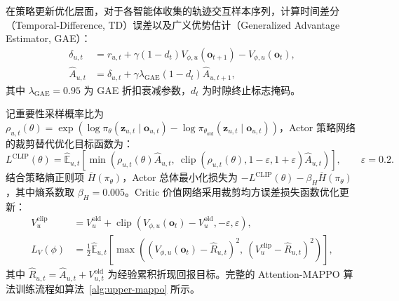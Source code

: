 在策略更新优化层面，对于各智能体收集的轨迹交互样本序列，计算时间差分（Temporal-Difference, TD）误差以及广义优势估计（Generalized Advantage Estimator, GAE）：
\begin{equation}
    \begin{aligned}
    \delta_{u,t} &= r_{u,t} + \gamma (1 - d_t) V_{\phi,u}(\mathbf o_{t+1}) - V_{\phi,u}(\mathbf o_t),\\
    \widehat A_{u,t} &= \delta_{u,t} + \gamma \lambda_{\mathrm{GAE}} (1 - d_t) \widehat A_{u,t+1},
    \end{aligned}
    \label{eq:gae}
\end{equation}
其中 $\lambda_{\mathrm{GAE}} = 0.95$ 为 GAE 折扣衰减参数，$d_t$ 为时隙终止标志掩码。

记重要性采样概率比为 $\rho_{u,t}(\theta) = \exp\left(\log\pi_\theta(\mathbf z_{u,t}\mid\mathbf o_{u,t}) - \log\pi_{\theta_{\mathrm{old}}}(\mathbf z_{u,t}\mid\mathbf o_{u,t})\right)$，Actor 策略网络的裁剪替代优化目标函数为：
\begin{equation}
    L^{\mathrm{CLIP}}(\theta) = \widehat{\mathbb E}_{u,t}\left[\min\left(
    \rho_{u,t}(\theta)\widehat A_{u,t}, \ 
    \operatorname{clip}(\rho_{u,t}(\theta), 1 - \varepsilon, 1 + \varepsilon)\widehat A_{u,t}
    \right)\right], \qquad \varepsilon=0.2.
    \label{eq:ppo-clip}
\end{equation}
结合策略熵正则项 $\overline H(\pi_\theta)$，Actor 总体最小化损失为 $-L^{\mathrm{CLIP}}(\theta) - \beta_H \overline H(\pi_\theta)$，其中熵系数取 $\beta_H = 0.005$。Critic 价值网络采用裁剪均方误差损失函数优化更新：
\begin{equation}
    \begin{aligned}
    V_u^{\mathrm{clip}} &= V_u^{\mathrm{old}} + \operatorname{clip}\left(V_{\phi,u}(\mathbf o_t) - V_u^{\mathrm{old}}, -\varepsilon, \varepsilon\right),\\
    L_V(\phi) &= \frac{1}{2}\widehat{\mathbb E}_{u,t}\left[\max\left(
    (V_{\phi,u}(\mathbf o_t) - \widehat R_{u,t})^2, \ 
    (V_u^{\mathrm{clip}} - \widehat R_{u,t})^2
    \right)\right],
    \end{aligned}
    \label{eq:ch3-value-clipping}
\end{equation}
其中 $\widehat R_{u,t} = \widehat A_{u,t} + V_{u,t}^{\mathrm{old}}$ 为经验累积折现回报目标。完整的 Attention-MAPPO 算法训练流程如算法~\ref{alg:upper-mappo} 所示。

